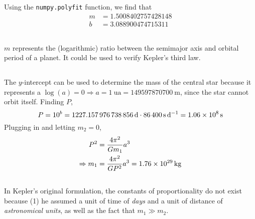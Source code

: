 \documentclass{article}
\begin{document}
\newpage

\subsection{}


Using the \lstinline|numpy.polyfit| function, we find that
\begin{align}
    m &= \num{1.5008402757428148} \\
    b &= \num{3.088900474715311}
\end{align}

\subsection{}

\(m\) represents the (logarithmic) ratio between the semimajor axis and orbital period of a planet.
It could be used to verify Kepler's third law.

\subsection{}

The \(y\)-intercept can be used to determine the mass of the central star because it represents a \(\log(a) = 0 \Rightarrow a = \SI{1}{\astronomicalunit} = \SI{149597870700}{\meter}\), since the star cannot orbit itself.
Finding \(P\),
\begin{equation}
    P = 10^b = \SI{1227.157976738856}{\day} \cdot \SI{86400}{\second\per\day} = \SI{1.06d8}{\second}
\end{equation}
Plugging in and letting \(m_2 = 0\),
\begin{align}
    P^2 &= \frac{4 \pi^2}{G m_1}a^3 \\
    \Rightarrow m_1 &= \frac{4 \pi^2}{G P^2}a^3 = \SI{1.76d29}{\kilogram}
\end{align}

\subsection{}

In Kepler's original formulation, the constants of proportionality do not exist because (1) he assumed a unit of time of \emph{days} and a unit of distance of \emph{astronomical units}, as well as the fact that \(m_1 \gg m_2\).
\end{document}
